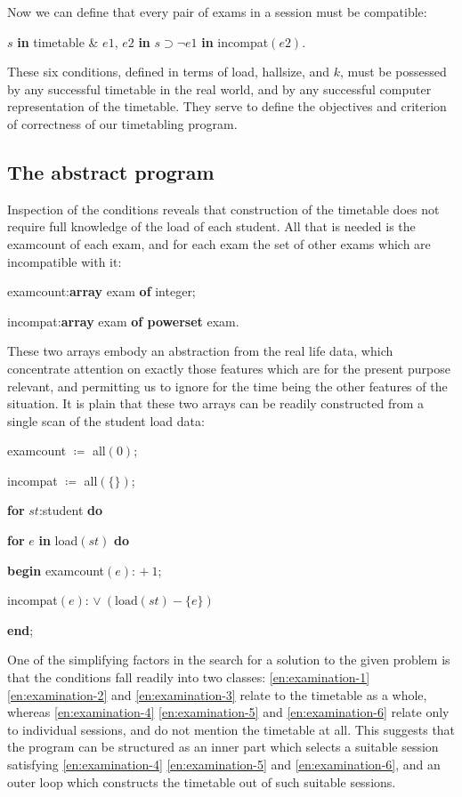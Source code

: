 \documentclass[twoside,11pt]{book}
\begin{document}
\noindent
Now we can define that every pair of exams in a session must be compatible:

\quad $s$ \textbf{in} timetable \& $e1$, $e2$ \textbf{in} $s \supset\neg e1$ \textbf{in} incompat$(e2)$.

These six conditions, defined in terms of load, hallsize, and $k$, must be possessed by any successful timetable in the real world, and by any successful computer representation of the timetable. They serve to define the objectives and criterion of correctness of our timetabling program.

\subsection{The abstract program}

Inspection of the conditions reveals that construction of the timetable does not require full knowledge of the load of each student. All that is needed is the examcount of each exam, and for each exam the set of other exams which are incompatible with it:

\quad examcount:\textbf{array} exam \textbf{of} integer;

\quad incompat:\textbf{array} exam \textbf{of powerset} exam.

\noindent
These two arrays embody an abstraction from the real life data, which concentrate attention on exactly those features which are for the present purpose relevant, and permitting us to ignore for the time being the other features of the situation. It is plain that these two arrays can be readily constructed from a single scan of the student load data:

\quad examcount $\coloneq$ all$(0)$;

\quad incompat $\coloneq$ all$(\{\})$;

\quad \textbf{for} $st$:student \textbf{do}

\quad \quad \textbf{for} $e$ \textbf{in} load$(st)$ \textbf{do}

\quad \quad \quad \textbf{begin} examcount$(e)$: $+\ 1$;

\quad \quad \quad \quad incompat$(e)$: $\vee\ (\text{load}(st) - \{e\})$

\quad \quad \quad \textbf{end};

One of the simplifying factors in the search for a solution to the given problem is that the conditions fall readily into two classes: \ref{en:examination-1} \ref{en:examination-2} and \ref{en:examination-3} relate to the timetable as a whole, whereas \ref{en:examination-4} \ref{en:examination-5} and \ref{en:examination-6} relate only to individual sessions, and do not mention the timetable at all. This suggests that the program can be structured as an inner part which selects a suitable session satisfying \ref{en:examination-4} \ref{en:examination-5} and \ref{en:examination-6}, and an outer loop which constructs the timetable out of such suitable sessions.
\end{document}
